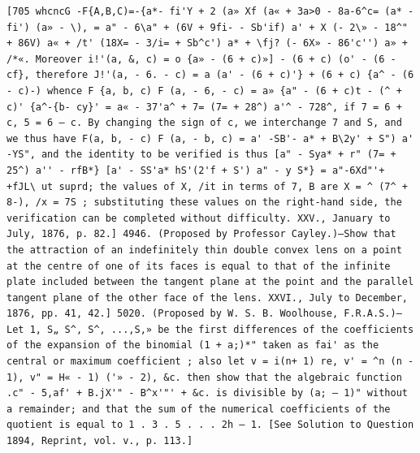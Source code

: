 \documentclass[11pt,a4paper]{book}
\begin{document}
\newpage
\setcounter{page}{594}
\begin{verbatim}
[705 whcncG -F{A,B,C)=-{a*- fi'Y + 2 (a» Xf (a« + 3a>0 - 8a-6^c= (a* - fi') (a» - \), = a" - 6\a" + (6V + 9fi- - Sb'if) a' + X (- 2\» - 18^" + 86V) a« + /t' (18X= - 3/i= + Sb^c') a* + \fj? (- 6X» - 86'c'') a» + /*«. Moreover i!'(a, &, c) = o {a» - (6 + c)»] - (6 + c) (o' - (6 - cf}, therefore J!'(a, - 6. - c) = a (a' - (6 + c)'} + (6 + c) {a^ - (6 - c)-) whence F {a, b, c) F (a, - 6, - c) = a» {a" - (6 + c)t - (^ + c)' {a^-{b- cy}' = a« - 37'a^ + 7= (7= + 28^) a'^ - 728^, if 7 = 6 + c, 5 = 6 — c. By changing the sign of c, we interchange 7 and S, and we thus have F(a, b, - c) F (a, - b, c) = a' -SB'- a* + B\2y' + S") a' -YS", and the identity to be verified is thus [a" - Sya* + r" (7= + 25^) a'' - rfB*} [a' - SS'a* hS'(2'f + S') a" - y S*} = a"-6Xd"'+ +fJL\ ut suprd; the values of X, /it in terms of 7, B are X = ^ (7^ + 8-), /x = 7S ; substituting these values on the right-hand side, the verification can be completed without difficulty. XXV., January to July, 1876, p. 82.] 4946. (Proposed by Professor Cayley.)—Show that the attraction of an indefinitely thin double convex lens on a point at the centre of one of its faces is equal to that of the infinite plate included between the tangent plane at the point and the parallel tangent plane of the other face of the lens. XXVI., July to December, 1876, pp. 41, 42.] 5020. (Proposed by W. S. B. Woolhouse, F.R.A.S.)—Let 1, S„ S^, S^, ...,S,» be the first differences of the coefficients of the expansion of the binomial (1 + a;)*" taken as fai' as the central or maximum coefficient ; also let v = i(n+ 1) re, v' = ^n (n - 1), v" = H« - 1) ('» - 2), &c. then show that the algebraic function .c" - 5,af' + B.jX'" - B^x'"' + &c. is divisible by (a; — 1)" without a remainder; and that the sum of the numerical coefficients of the quotient is equal to 1 . 3 . 5 . . . 2h — 1. [See Solution to Question 1894, Reprint, vol. v., p. 113.] 
\end{verbatim}
\end{document}
